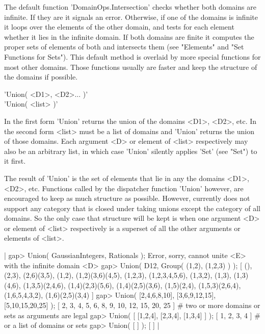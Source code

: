 The default function 'DomainOps.Intersection' checks whether both domains
are infinite.  If they are it signals an error.  Otherwise, if one of the
domains is infinite it loops over  the elements of  the other domain, and
tests for each element whether it lies in the  infinite domain.   If both
domains are finite  it computes the proper sets  of elements  of both and
intersects them  (see "Elements" and  "Set Functions  for  Sets").   This
default method is  overlaid  by more special  functions  for  most  other
domains.  Those  functions  usually are faster  and keep the structure of
the domains if possible.

%

'Union( <D1>, <D2>... )' \\
'Union( <list> )'

In  the first form  'Union' returns the union of  the domains <D1>, <D2>,
etc.  In the second form  <list> must be  a  list of domains and  'Union'
returns the  union of  those domains.   Each argument  <D> or element  of
<list> respectively may also be an  arbitrary list, in which case 'Union'
silently applies 'Set' (see "Set") to it first.

The result of 'Union' is the set of elements that lie  in any the domains
<D1>,   <D2>, etc.  Functions called   by the dispatcher function 'Union'
however, are encouraged to keep as much  structure as possible.  However,
currently  {\GAP} does  not  support any  category  that  is closed under
taking unions except the category of all  domains.  So the only case that
structure will be  kept is when  one  argument <D>  or element of  <list>
respectively is a  superset  of all  the other arguments  or elements  of
<list>.

|    gap> Union( GaussianIntegers, Rationals );
    Error, sorry, cannot unite <E> with the infinite domain <D>
    gap> Union( D12, Group( (1,2), (1,2,3) ) );
    [ (), (2,3), (2,6)(3,5), (1,2), (1,2)(3,6)(4,5), (1,2,3),
      (1,2,3,4,5,6), (1,3,2), (1,3), (1,3)(4,6), (1,3,5)(2,4,6),
      (1,4)(2,3)(5,6), (1,4)(2,5)(3,6), (1,5)(2,4), (1,5,3)(2,6,4),
      (1,6,5,4,3,2), (1,6)(2,5)(3,4) ]
    gap> Union( [2,4,6,8,10], [3,6,9,12,15], [5,10,15,20,25] );
    [ 2, 3, 4, 5, 6, 8, 9, 10, 12, 15, 20, 25 ]
        # two or more domains or sets as arguments are legal
    gap> Union( [ [1,2,4], [2,3,4], [1,3,4] ] );
    [ 1, 2, 3, 4 ]    # or a list of domains or sets
    gap> Union( [ ] );
    [  ] |

